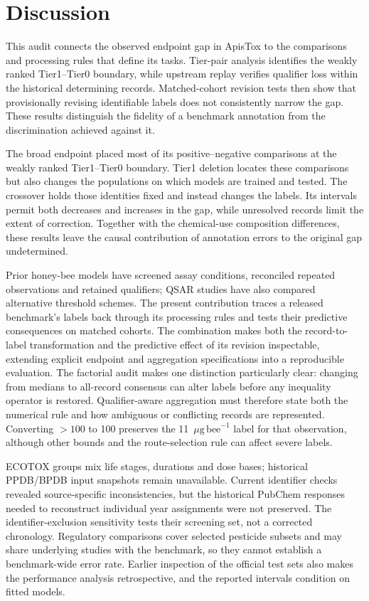 \documentclass{ieeeaccess}
\newcommand{\ugbee}{\ensuremath{\mu\mathrm{g\,bee}^{-1}}\xspace}
\begin{document}
\section{Discussion}
This audit connects the observed endpoint gap in ApisTox to the comparisons and processing rules that define its tasks. Tier-pair analysis identifies the weakly ranked Tier1--Tier0 boundary, while upstream replay verifies qualifier loss within the historical determining records. Matched-cohort revision tests then show that provisionally revising identifiable labels does not consistently narrow the gap. These results distinguish the fidelity of a benchmark annotation from the discrimination achieved against it.

The broad endpoint placed most of its positive--negative comparisons at the weakly ranked Tier1--Tier0 boundary. Tier1 deletion locates these comparisons but also changes the populations on which models are trained and tested. The crossover holds those identities fixed and instead changes the labels. Its intervals permit both decreases and increases in the gap, while unresolved records limit the extent of correction. Together with the chemical-use composition differences, these results leave the causal contribution of annotation errors to the original gap undetermined.

Prior honey-bee models have screened assay conditions, reconciled repeated observations and retained qualifiers\cite{Carnesecchi2020,Iovine2026}; QSAR studies have also compared alternative threshold schemes\cite{Wang2023}. The present contribution traces a released benchmark's labels back through its processing rules and tests their predictive consequences on matched cohorts. The combination makes both the record-to-label transformation and the predictive effect of its revision inspectable, extending explicit endpoint and aggregation specifications\cite{Nael2026} into a reproducible evaluation. The factorial audit makes one distinction particularly clear: changing from medians to all-record consensus can alter labels before any inequality operator is restored. Qualifier-aware aggregation must therefore state both the numerical rule and how ambiguous or conflicting records are represented. Converting \(>100\) to 100 preserves the 11~\ugbee label for that observation, although other bounds and the route-selection rule can affect severe labels.

ECOTOX groups mix life stages, durations and dose bases; historical PPDB/BPDB input snapshots remain unavailable. Current identifier checks revealed source-specific inconsistencies, but the historical PubChem responses needed to reconstruct individual year assignments were not preserved. The identifier-exclusion sensitivity tests their screening set, not a corrected chronology. Regulatory comparisons cover selected pesticide subsets and may share underlying studies with the benchmark, so they cannot establish a benchmark-wide error rate. Earlier inspection of the official test sets also makes the performance analysis retrospective, and the reported intervals condition on fitted models.
\end{document}
